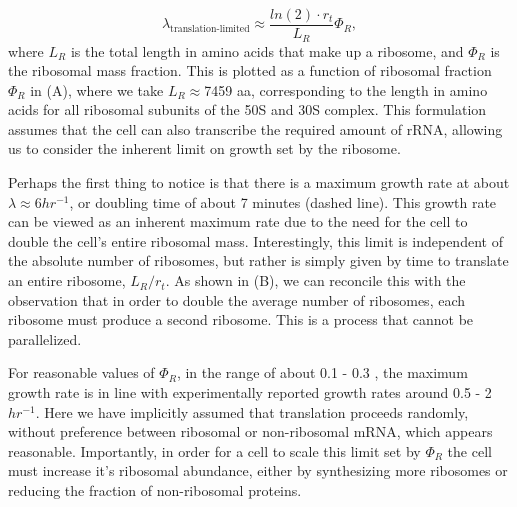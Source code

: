 \begin{equation}
\lambda_{\textrm{translation-limited}} \approx \frac{ln(2) \cdot r_t}{L_R}  \Phi_R,
\label{eq:translation_limit_growth_rate}
\end{equation}
where $L_R$ is the total length in amino acids that make up a ribosome, and
$\Phi_R$ is the ribosomal mass fraction. This is plotted as a function of
ribosomal fraction $\Phi_R$ in (A), where we take $L_R
\approx $7459 aa, corresponding to the length in amino acids for all ribosomal
subunits of the 50S and 30S complex. This formulation assumes that the cell can
also transcribe the required amount of rRNA, allowing us to consider the
inherent limit on growth set by the ribosome.

Perhaps the first thing to notice is that there is a maximum growth rate at
about $\lambda \approx 6 hr^{-1}$, or doubling time of about 7 minutes (dashed
line). This growth rate can be viewed as an inherent maximum rate due to
the need for the cell to double the cell's entire ribosomal mass. Interestingly,
this limit is independent of the absolute number of ribosomes, but rather is
simply given by time to translate an entire ribosome, $L_R/ r_t$. As shown in
(B), we can reconcile this with the observation that in order
to double the average number of ribosomes, each ribosome must produce a second
ribosome. This is a process that cannot be parallelized.

For reasonable values of $\Phi_R$, in the range of about 0.1 - 0.3
\citep{scott2010}, the maximum growth rate is in line with experimentally
reported growth rates around 0.5 - 2 $hr^{-1}$. Here we have implicitly assumed
that translation proceeds randomly, without preference between ribosomal or
non-ribosomal mRNA, which appears reasonable. Importantly, in order for a cell
to scale this limit set by $\Phi_R$ the cell must increase it's ribosomal
abundance, either by synthesizing more ribosomes or reducing the fraction of
non-ribosomal proteins.

